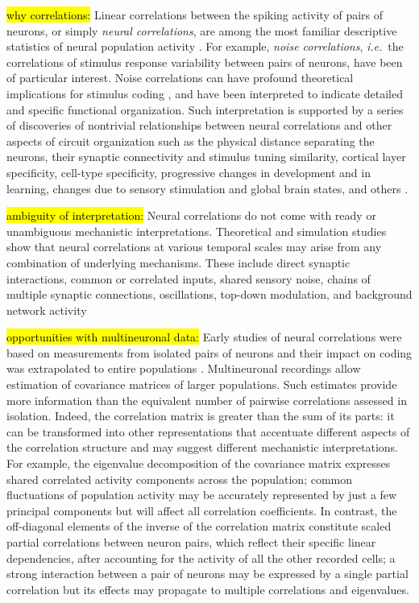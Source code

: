 \hl{\tiny why correlations:} Linear correlations between the spiking activity of pairs of neurons, or simply \emph{neural correlations}, are among the most familiar descriptive statistics of neural population activity \citep{Cohen:2011}.  For example, \emph{noise correlations}, \emph{i.e.}~the correlations of stimulus response variability between pairs of neurons, have been of particular interest.  Noise correlations can have profound theoretical implications for stimulus coding \citep{Zohary:1994,Abbott:1999,Averbeck:2006,Berens:2011}, and have been interpreted to indicate detailed and specific functional organization. Such interpretation is supported by a series of discoveries of nontrivial relationships between neural correlations and other aspects of circuit organization such as the physical distance separating the neurons, their synaptic connectivity and stimulus tuning similarity, cortical layer specificity, cell-type specificity, progressive changes in development and in learning, changes due to sensory stimulation and global brain states, and others \citep{Kohn:2005,Smith:2008,Kohn:2009,Goard:2009,Golshani:2009,Renart:2010,Ecker:2010,Smith:2013,Denman:2013}. 

\hl{\tiny ambiguity of interpretation:} Neural correlations do not come with ready or unambiguous mechanistic interpretations.  Theoretical and simulation studies show that neural correlations at various temporal scales may arise from any combination of underlying mechanisms.  These include direct synaptic interactions, common or correlated inputs, shared sensory noise, chains of multiple synaptic connections, oscillations, top-down modulation, and background network activity \citep{Perkel:1967b,Shadlen:1998,Salinas:2001,Ostojic:2009,Rosenbaum:2011}

\hl{\tiny opportunities with multineuronal data:} Early studies of neural correlations were based on measurements from isolated pairs of neurons and their impact on coding was extrapolated to entire populations \citep{Shadlen:1998,Zohary:1994}.  Multineuronal recordings allow estimation of covariance matrices of larger populations.  Such estimates provide more information than the equivalent number of pairwise correlations assessed in isolation. Indeed, the correlation matrix is greater than the sum of its parts: it can be transformed into other representations that accentuate different aspects of the correlation structure and may suggest different mechanistic interpretations. For example, the eigenvalue decomposition of the covariance matrix expresses shared correlated activity components across the population; common fluctuations of population activity may be accurately represented by just a few principal components but will affect all correlation coefficients. In contrast, the off-diagonal elements of the inverse of the correlation matrix constitute scaled partial correlations between neuron pairs, which reflect their specific linear dependencies, after accounting for the activity of all the other recorded cells; a strong interaction between a pair of neurons may be expressed by a single partial correlation but its effects may propagate to multiple correlations and eigenvalues.

